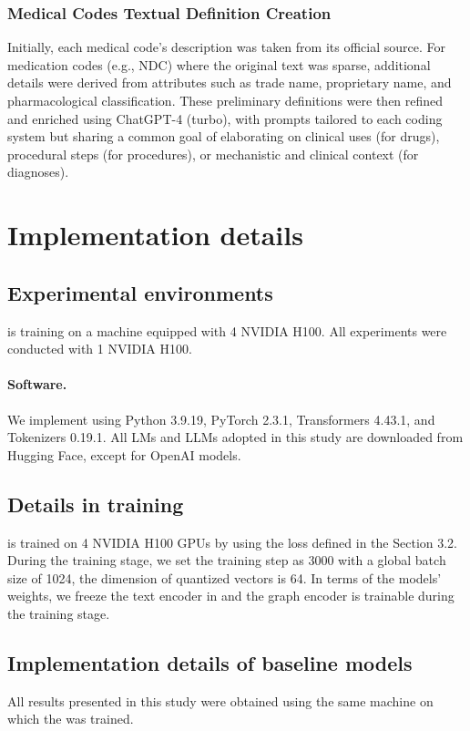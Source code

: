 \subsubsection{Medical Codes Textual Definition Creation}
Initially, each medical code’s description was taken from its official source. For medication codes (e.g., NDC) where the original text was sparse, additional details were derived from attributes such as trade name, proprietary name, and pharmacological classification. These preliminary definitions were then refined and enriched using ChatGPT-4 (turbo), with prompts tailored to each coding system but sharing a common goal of elaborating on clinical uses (for drugs), procedural steps (for procedures), or mechanistic and clinical context (for diagnoses).

\section{Implementation details}\label{appendix_implementation}

\subsection{Experimental environments}
 \model is training on a machine equipped with 4 NVIDIA H100. All experiments were conducted with 1 NVIDIA H100.

\paragraph{Software.} We implement \model using Python 3.9.19, PyTorch 2.3.1, Transformers 4.43.1, and Tokenizers 0.19.1. All LMs and LLMs adopted in this study are downloaded from Hugging Face, except for OpenAI models.

\subsection{Details in \model training}
\model is trained on 4 NVIDIA H100 GPUs by using the loss defined in the Section 3.2. During the training stage, we set the training step as 3000 with a global batch size of 1024, the dimension of quantized vectors is 64. In terms of the models' weights, we freeze the text encoder in \model and the graph encoder is trainable during the training stage. 

\subsection{Implementation details of baseline models}
All results presented in this study were obtained using the same machine on which the \model was trained.

